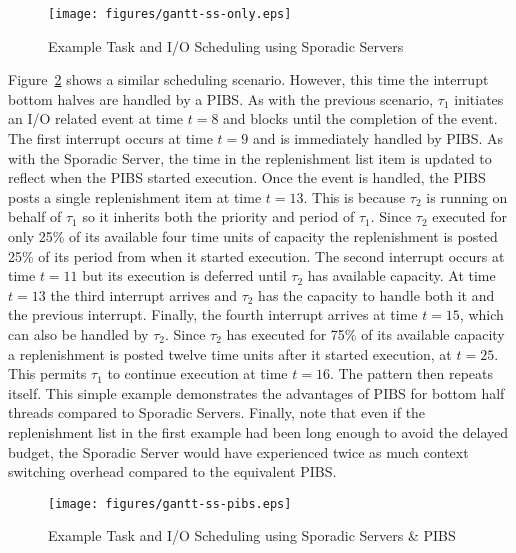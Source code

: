 \begin{figure}[h]
  \centering
  \texttt{[image: figures/gantt-ss-only.eps]}
  \vspace{0.05in}
  \caption{Example Task and I/O Scheduling using Sporadic Servers}

  \label{fig:gantt_ss_only}
\end{figure}

Figure~\ref{fig:gantt_ss_pibs} shows a similar scheduling scenario. However,
this time the interrupt bottom halves are handled by a PIBS.  As with the
previous scenario, $\tau_1$ initiates an I/O related event at time $t{=}8$ and
blocks until the completion of the event.  The first interrupt occurs at time
$t{=}9$ and is immediately handled by PIBS.  As with the Sporadic Server, the
time in the replenishment list item is updated to reflect when the PIBS
started execution.  Once the event is handled, the PIBS posts a single
replenishment item at time $t{=}13$.  This is because $\tau_2$ is running on
behalf of $\tau_1$ so it inherits both the priority and period of $\tau_1$.
Since $\tau_2$ executed for only 25\% of its available four time units of
capacity the replenishment is posted 25\% of its period from when it started
execution.  The second interrupt occurs at time $t{=}11$ but its execution is
deferred until $\tau_2$ has available capacity.  At time $t{=}13$ the third
interrupt arrives and $\tau_2$ has the capacity to handle both it and the
previous interrupt.  Finally, the fourth interrupt arrives at time $t{=}15$,
which can also be handled by $\tau_2$.  Since $\tau_2$ has executed for 75\%
of its available capacity a replenishment is posted twelve time units after it
started execution, at $t{=}25$.  This permits $\tau_1$ to continue execution
at time $t{=}16$.  The pattern then repeats itself.  This simple example
demonstrates the advantages of PIBS for bottom half threads compared to
Sporadic Servers.  Finally, note that even if the replenishment list in the
first example had been long enough to avoid the delayed budget, the Sporadic
Server would have experienced twice as much context switching overhead
compared to the equivalent PIBS.

\begin{figure}[h]
  \vspace{-0.15in}
  \centering
  \texttt{[image: figures/gantt-ss-pibs.eps]}
  \vspace{0.05in}
  \caption{Example Task and I/O Scheduling using Sporadic Servers \& PIBS}

  \label{fig:gantt_ss_pibs}
  \vspace{-0.15in}
\end{figure}


